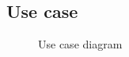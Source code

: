 \subsection{Use case}
\begin{figure}[!h]
	\centering
	\caption{Use case diagram}
\end{figure}
\clearpage

